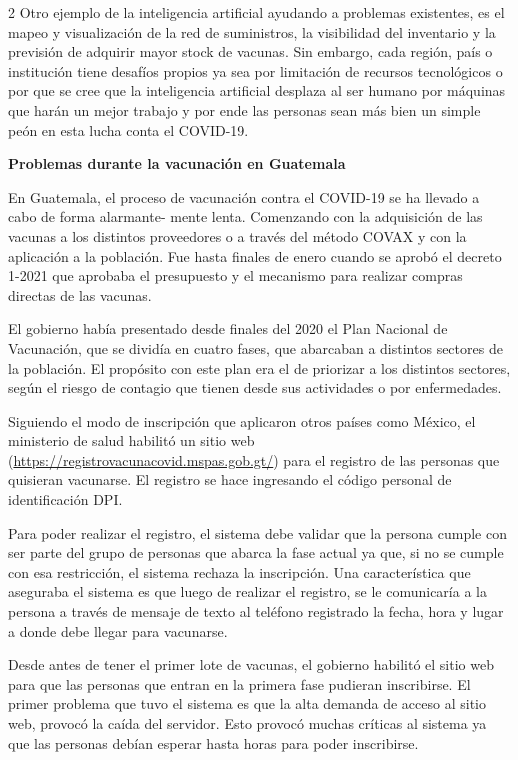 \documentclass[12pt,spanish,Letterpaper,openany]{book}
\begin{document}
\begin {multicols}{2}
Otro ejemplo de la inteligencia artificial ayudando a problemas existentes, es el mapeo y
visualización de la red de suministros, la visibilidad del inventario y la previsión de adquirir
mayor stock de vacunas. Sin embargo, cada región, país o institución tiene desafíos propios
ya sea por limitación de recursos tecnológicos o por que se cree que la inteligencia artificial
desplaza al ser humano por máquinas que harán un mejor trabajo y por ende las personas
sean más bien un simple peón en esta lucha conta el COVID-19.

\textbf{Problemas durante la vacunación en Guatemala}

En Guatemala, el proceso de vacunación contra el COVID-19 se ha llevado a cabo de forma alarmante-
mente lenta. Comenzando con la adquisición de las vacunas a los distintos
proveedores o a través del método COVAX y con la aplicación a la población. Fue hasta
finales de enero cuando se aprobó el decreto 1-2021 que aprobaba el presupuesto y el
mecanismo para realizar compras directas de las vacunas.

El gobierno había presentado desde finales del 2020 el Plan Nacional de Vacunación, que se
dividía en cuatro fases, que abarcaban a distintos sectores de la población. El propósito con
este plan era el de priorizar a los distintos sectores, según el riesgo de contagio que tienen
desde sus actividades o por enfermedades.

Siguiendo el modo de inscripción que aplicaron otros países como México, el ministerio de
salud habilitó un sitio web (\url{https://registrovacunacovid.mspas.gob.gt/}) para el registro de las
personas que quisieran vacunarse. El registro se hace ingresando el código personal de
identificación DPI.

Para poder realizar el registro, el sistema debe validar que la persona cumple con ser parte
del grupo de personas que abarca la fase actual ya que, si no se cumple con esa restricción,
el sistema rechaza la inscripción. Una característica que aseguraba el sistema es que luego de
realizar el registro, se le comunicaría a la persona a través de mensaje de texto al teléfono
registrado la fecha, hora y lugar a donde debe llegar para vacunarse.

Desde antes de tener el primer lote de vacunas, el gobierno habilitó el sitio web para que las
personas que entran en la primera fase pudieran inscribirse. El primer problema que tuvo el
sistema es que la alta demanda de acceso al sitio web, provocó la caída del servidor. Esto
provocó muchas críticas al sistema ya que las personas debían esperar hasta horas para poder
inscribirse.


\end{multicols}
\end{document}
